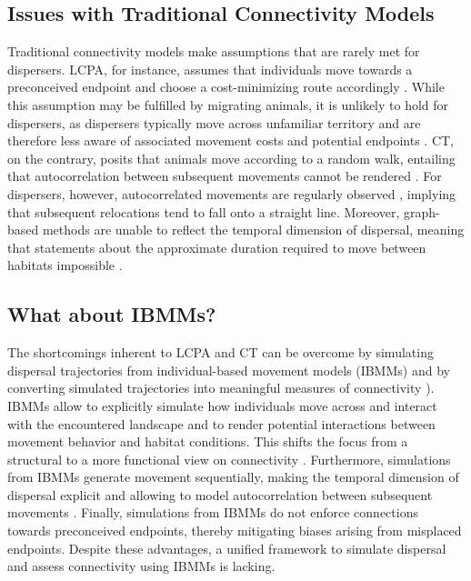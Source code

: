 \documentclass[abstract=on,10pt,a4paper,bibliography=totocnumbered]{article}
\begin{document}
\subsection{Issues with Traditional Connectivity Models}
Traditional connectivity models make assumptions that are rarely met for
dispersers. LCPA, for instance, assumes that individuals move towards a
preconceived endpoint and choose a cost-minimizing route accordingly
\citep{Sawyer.2011, Abrahms.2017}. While this assumption may be fulfilled by
migrating animals, it is unlikely to hold for dispersers, as dispersers
typically move across unfamiliar territory and are therefore less aware of
associated movement costs and potential endpoints \citep{Koen.2014, Cozzi.2020}.
CT, on the contrary, posits that animals move according to a random walk,
entailing that autocorrelation between subsequent movements cannot be rendered
\citep{Diniz.2019}. For dispersers, however, autocorrelated movements are
regularly observed \citep{Cozzi.2020, Hofmann.2021}, implying that subsequent
relocations tend to fall onto a straight line. Moreover, graph-based methods are
unable to reflect the temporal dimension of dispersal, meaning that statements
about the approximate duration required to move between habitats impossible
\citep{Martensen.2017, Diniz.2019}.

\subsection{What about IBMMs?}
The shortcomings inherent to LCPA and CT can be overcome by simulating dispersal
trajectories from individual-based movement models (IBMMs) and by converting
simulated trajectories into meaningful measures of connectivity
\citep{Diniz.2019}). IBMMs allow to explicitly simulate how individuals move
across and interact with the encountered landscape \citep{Kanagaraj.2013,
Clark.2015, Allen.2016, Hauenstein.2019, Zeller.2020} and to render potential
interactions between movement behavior and habitat conditions. This shifts the
focus from a structural to a more functional view on connectivity
\citep{Tischendorf.2000, Kanagaraj.2013, Hauenstein.2019}. Furthermore,
simulations from IBMMs generate movement sequentially, making the temporal
dimension of dispersal explicit and allowing to model autocorrelation between
subsequent movements \citep{Diniz.2019}. Finally, simulations from IBMMs do not
enforce connections towards preconceived endpoints, thereby mitigating biases
arising from misplaced endpoints. Despite these advantages, a unified framework
to simulate dispersal and assess connectivity using IBMMs is lacking.
\end{document}
